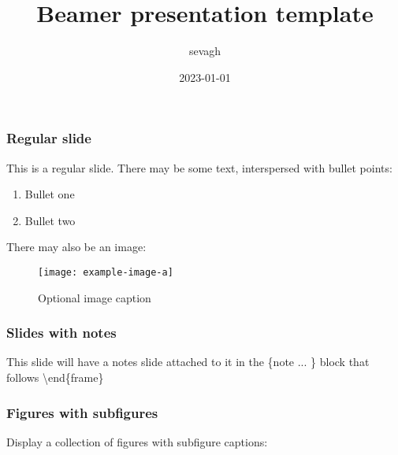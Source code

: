 \documentclass[usenames,dvipsnames]{beamer}
\title{Beamer presentation template}
\author{sevagh}
\date{2023-01-01}
\begin{document}
\begin{frame}
\maketitle
\end{frame}

\begin{frame}
	\frametitle{Regular slide}
	This is a regular slide. There may be some text, interspersed with bullet points:
	\begin{enumerate}
		\item
			Bullet one
		\item
			Bullet two
	\end{enumerate}
	\vspace{1em}
	There may also be an image:
	\begin{figure}
		\centering
		\texttt{[image: example-image-a]}
		\caption{Optional image caption}
	\end{figure}
\end{frame}

\begin{frame}
	\frametitle{Slides with notes}
	This slide will have a notes slide attached to it in the \{note ... \} block that follows \textbackslash end\{frame\}
\end{frame}


\begin{frame}
	\frametitle{Figures with subfigures}
	Display a collection of figures with subfigure captions:
	\begin{figure}
		\centering
		\\ %
	\end{figure}
\end{frame}
\end{document}
